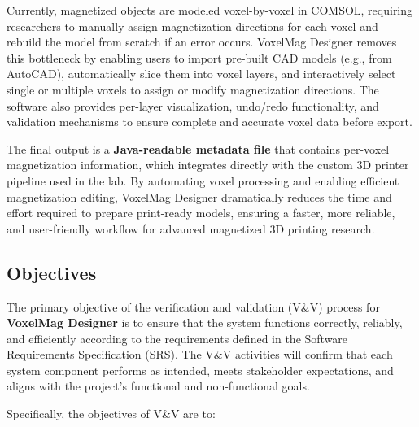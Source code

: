 \documentclass[12pt, titlepage]{article}
\begin{document}
Currently, magnetized objects are modeled voxel-by-voxel in COMSOL, requiring researchers to manually assign magnetization directions for each voxel and rebuild the model from scratch if an error occurs. VoxelMag Designer removes this bottleneck by enabling users to import pre-built CAD models (e.g., from AutoCAD), automatically slice them into voxel layers, and interactively select single or multiple voxels to assign or modify magnetization directions. The software also provides per-layer visualization, undo/redo functionality, and validation mechanisms to ensure complete and accurate voxel data before export.

The final output is a \textbf{Java-readable metadata file} that contains per-voxel magnetization information, which integrates directly with the custom 3D printer pipeline used in the lab. By automating voxel processing and enabling efficient magnetization editing, VoxelMag Designer dramatically reduces the time and effort required to prepare print-ready models, ensuring a faster, more reliable, and user-friendly workflow for advanced magnetized 3D printing research.

\subsection{Objectives}

The primary objective of the verification and validation (V\&V) process for \textbf{VoxelMag Designer} is to ensure that the system functions correctly, reliably, and efficiently according to the requirements defined in the Software Requirements Specification (SRS). The V\&V activities will confirm that each system component performs as intended, meets stakeholder expectations, and aligns with the project’s functional and non-functional goals.

Specifically, the objectives of V\&V are to:
\end{document}
